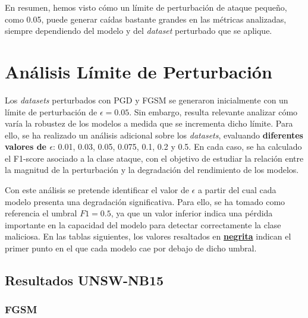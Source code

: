 En resumen, hemos visto cómo un límite de perturbación de ataque pequeño, como 0.05, puede generar caídas bastante grandes en las métricas analizadas, siempre dependiendo del modelo y del \textit{dataset} perturbado que se aplique.


\section{Análisis Límite de Perturbación}

Los \textit{datasets} perturbados con PGD y FGSM se generaron inicialmente con un límite de perturbación de $\epsilon = 0.05$. Sin embargo, resulta relevante analizar cómo varía la robustez de los modelos a medida que se incrementa dicho límite. Para ello, se ha realizado un análisis adicional sobre los \textit{datasets}, evaluando \textbf{diferentes valores de $\epsilon$}: 0.01, 0.03, 0.05, 0.075, 0.1, 0.2 y 0.5. En cada caso, se ha calculado el F1-score asociado a la clase ataque, con el objetivo de estudiar la relación entre la magnitud de la perturbación y la degradación del rendimiento de los modelos.

Con este análisis se pretende identificar el valor de $\epsilon$ a partir del cual cada modelo presenta una degradación significativa. Para ello, se ha tomado como referencia el umbral $F1 = 0.5$, ya que un valor inferior indica una pérdida importante en la capacidad del modelo para detectar correctamente la clase maliciosa. En las tablas siguientes, los valores resaltados en \underline{\textbf{negrita}} indican el primer punto en el que cada modelo cae por debajo de dicho umbral.

\subsection{Resultados UNSW-NB15} 

\subsubsection{FGSM}

